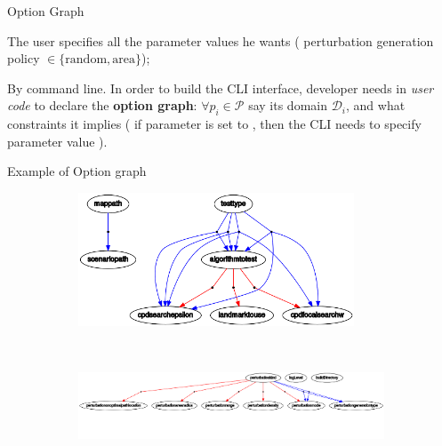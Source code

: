 \begin{frame}{Option Graph}
    \begin{block}{\hphantom{}}
        The user specifies all the parameter values he wants (\eg{} perturbation generation policy $\in \{ \mbox{random}, \mbox{area} \}$);
    \end{block}

    \begin{minipage}{0.49\textwidth}
        By command line. In order to build the CLI interface, developer needs in \textit{user code} to declare the \textbf{option graph}: $\forall p_i \in \mathcal{P}$ say its domain $\mathcal{D}_i$, and what constraints it implies (\eg{} if parameter  is set to , then the CLI needs to specify parameter value ).
    \end{minipage}\hfill%
    \begin{minipage}{0.49\textwidth}
        \begin{tikzpicture}
            
        \end{tikzpicture}
    \end{minipage}
\end{frame}

\begin{frame}{Example of Option graph}
    \begin{figure}
        \begin{subfigure}{1.0\textwidth}
            \centering
            \includegraphics[width=0.9\textwidth]{src/images/optionGraph1.png}
        \end{subfigure}\\
        \begin{subfigure}{1.0\textwidth}
            \centering
            \includegraphics[width=1.09\textwidth]{src/images/optionGraph2.png}
        \end{subfigure}
    \end{figure}
\end{frame}

